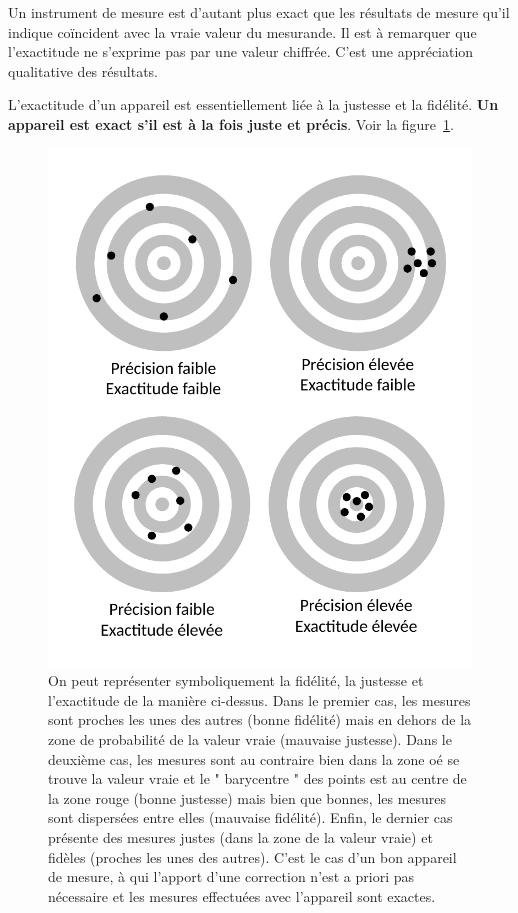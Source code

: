 Un instrument de mesure est d'autant plus exact que les résultats de mesure qu'il indique coïncident avec la vraie valeur du mesurande. Il est à remarquer que l'exactitude ne s'exprime pas par une valeur chiffrée. C'est une appréciation qualitative des résultats.

L'exactitude d'un appareil est essentiellement liée à la justesse et la fidélité. \textbf{Un appareil est exact s'il est à la fois juste et précis}. Voir la figure~\ref{fig:exact}.

\begin{figure}[htbp]
   \centering
   \includegraphics[width=12cm]{assets/figures/juste-fidèle-précis.pdf}
   \caption{On peut représenter symboliquement la fidélité, la justesse et l'exactitude de la manière ci-dessus. Dans le premier cas, les mesures sont proches les unes des autres (bonne fidélité) mais en dehors de la zone de probabilité de la valeur vraie (mauvaise justesse). Dans le deuxième cas, les mesures sont au contraire bien dans la zone oé se trouve la valeur vraie et le " barycentre " des points est au centre de la zone rouge (bonne justesse) mais bien que bonnes, les mesures sont dispersées entre elles (mauvaise fidélité). Enfin, le dernier cas présente des mesures justes (dans la zone de la valeur vraie) et fidèles (proches les unes des autres). C'est le cas d'un bon appareil de mesure, à qui l'apport d'une correction n'est a priori pas nécessaire et les mesures effectuées avec l'appareil sont exactes.}
   \label{fig:exact}
\end{figure}

